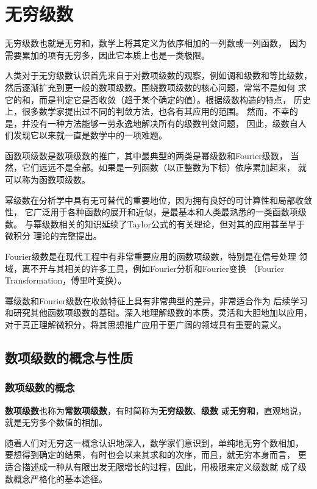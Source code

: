 \setcounter{chapter}{11}

\chapter{无穷级数}

无穷级数也就是{\kaishu 无穷和}，数学上将其定义为{\kaishu 依序相加}的一列数或一列函数，
因为需要累加的项有无穷多，因此它本质上也是一类极限。

人类对于无穷级数认识首先来自于对数项级数的观察，例如{\kaishu 调和级数}和{\kaishu 等比级数}，
然后逐渐扩充到更一般的数项级数。围绕数项级数的核心问题，常常不是如何
求它的和，而是判定它是否收敛（趋于某个确定的值）。根据级数构造的特点，
历史上，很多数学家提出过不同的判敛方法，也各有其应用的范围。
然而，不幸的是，并没有一种方法能够一劳永逸地解决所有的级数判敛问题，
因此，级数自人们发现它以来就一直是数学中的一项难题。

函数项级数是数项级数的推广，其中最典型的两类是{\kaishu 幂级数}和{\kaishu Fourier级数}，
当然，它们远远不是全部。如果是一列函数（以正整数为下标）依序累加起来，
就可以称为函数项级数。

幂级数在分析学中具有无可替代的重要地位，因为拥有良好的可计算性和局部收敛性，
它广泛用于各种函数的展开和近似，是最基本和人类最熟悉的一类函数项级数。
与幂级数相关的知识延续了Taylor公式的有关理论，但对其的应用甚至早于微积分
理论的完整提出。

Fourier级数是在现代工程中有非常重要应用的函数项级数，特别是在信号处理
领域，离不开与其相关的许多工具，例如Fourier分析和Fourier变换
（Fourier Transformation，傅里叶变换）。

幂级数和Fourier级数在收敛特征上具有非常典型的差异，非常适合作为
后续学习和研究其他函数项级数的基础。深入地理解级数的本质，灵活和大胆地加以应用，
对于真正理解微积分，将其思想推广应用于更广阔的领域具有重要的意义。

\section{数项级数的概念与性质}

\subsection{数项级数的概念}

{\bf 数项级数}也称为{\bf 常数项级数}，有时简称为{\bf 无穷级数}、{\bf 级数}
或{\bf 无穷和}，直观地说，就是无穷多个数值的相加。

随着人们对无穷这一概念认识地深入，数学家们意识到，单纯地无穷个数相加，
要想得到确定的结果，有时也会以来其求和的次序，而且，就无穷本身而言，
更适合描述成一种从有限出发无限增长的过程，因此，用极限来定义级数就
成了级数概念严格化的基本途径。

